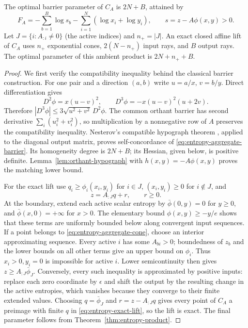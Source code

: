 \begin{theorem}\label{thm:entropy-aggregation}
The optimal barrier parameter of $C_A$ is $2N+B$, attained by
\begin{equation}\label{eq:entropy-aggregate-barrier}
 F_A=-\sum_{b=1}^B\log s_b-\sum_{i=1}^N(\log x_i+\log y_i),
 \qquad s=z-A\phi(x,y)>0.
\end{equation}
Let $J=\{i:A_{:i}\ne0\}$ (the active indices) and $n_+=|J|$.  An exact
closed affine lift of $C_A$ uses $n_+$ exponential cones, $2(N-n_+)$ input rays,
and $B$ output rays.
The optimal parameter of this ambient product is $2N+n_++B$.
\end{theorem}
\begin{proof}
We first verify the compatibility inequality behind the classical
barrier construction.
For one pair and a direction $(a,b)$ write $u=a/x$, $v=b/y$.
Direct differentiation gives
\[
 D^2\phi=x(u-v)^2,\qquad
 D^3\phi=-x(u-v)^2(u+2v).
\]
Therefore $|D^3\phi|\leq3\sqrt{u^2+v^2}\,D^2\phi$.
The common orthant barrier has second derivative
$\sum_i(u_i^2+v_i^2)$, so multiplication by a nonnegative row of $A$
preserves the compatibility inequality.  Nesterov's compatible
hypograph theorem \citep[Theorem 3.3]{FS2023}, applied to the diagonal
output matrix, proves self-concordance of \eqref{eq:entropy-aggregate-barrier}.
Its homogeneity degree is $2N+B$; its Hessian, given below, is
positive definite.  Lemma~\ref{lem:orthant-hypograph} with
$h(x,y)=-A\phi(x,y)$ proves the matching lower bound.

For the exact lift use $q_i\geq\phi_i(x_i,y_i)$ for $i\in J$,
$(x_i,y_i)\geq0$ for $i\notin J$, and
\begin{equation}\label{eq:entropy-exact-lift}
 z=A_{:J}q+r,\qquad r\geq0.
\end{equation}
At the boundary, extend each active scalar entropy by
$\bar\phi(0,y)=0$ for $y\geq0$, and
$\bar\phi(x,0)=+\infty$ for $x>0$.
The elementary bound $\phi(x,y)\geq-y/e$ shows that these terms are
uniformly bounded below along convergent input sequences.
If a point belongs to \eqref{eq:entropy-aggregate-cone}, choose an interior
approximating sequence.  Every active $i$ has some $A_{bi}>0$; boundedness
of $z_b$ and the lower bounds on all other terms give an upper bound on
$\phi_i$.  Thus $x_i>0,y_i=0$ is impossible for active $i$.
Lower semicontinuity then gives $z\geq A_{:J}\bar\phi_J$.
Conversely, every such inequality is approximated by positive inputs:
replace each zero coordinate by $\epsilon$ and shift the output by the
resulting change in the active entropies, which vanishes because they
converge to their finite extended values.  Choosing $q=\bar\phi_J$ and
$r=z-A_{:J}q$ gives every point of $C_A$ a preimage with finite $q$ in
\eqref{eq:entropy-exact-lift}, so the lift is exact.  The final parameter
follows from Theorem~\ref{thm:entropy-product}.
\end{proof}

